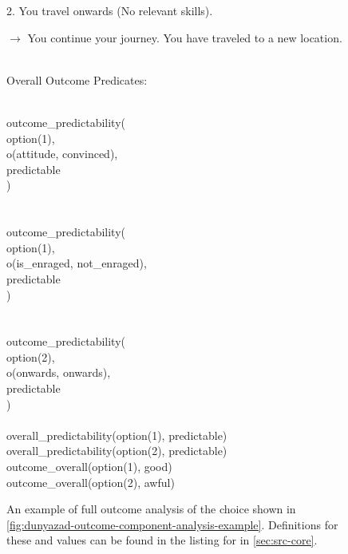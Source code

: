 \begin{enumerate}[leftmargin=1.4em]
\begin{figure}[!p]
{{{\begin{hangparas}{1.3em}{1}
2. You travel onwards (No relevant skills). \\
\ind \parbox{0.88\linewidth}{$\rightarrow$ You continue your journey. \newline You have traveled to a new location.}
\end{hangparas}
} \vind \\
Overall Outcome Predicates:\svind \\
\ind \parbox{0.85\textwidth}{ \tt \raggedright
{} \\
\ind outcome\_predictability( \\
\ind \ind option(1), \\
\ind \ind o(attitude, convinced), \\
\ind \ind predictable \\
\ind ) \\
 \\
 \\
\ind outcome\_predictability( \\
\ind \ind option(1), \\
\ind \ind o(is\_enraged, not\_enraged), \\
\ind \ind predictable \\
\ind ) \\
 \\
 \\
\ind outcome\_predictability( \\
\ind \ind option(2), \\
\ind \ind o(onwards, onwards), \\
\ind \ind predictable \\
\ind ) \\
 \\
 overall\_predictability(option(1), predictable) \\
 overall\_predictability(option(2), predictable) \\
 outcome\_overall(option(1), good) \\
 outcome\_overall(option(2), awful) \\
}
}
}
\caption[\dunyazad/ outcome component analysis example]{An example of full outcome analysis of the choice shown in \cref{fig:dunyazad-outcome-component-analysis-example}. Definitions for these   and  values can be found in the listing for  in \cref{sec:src-core}.}
\label{fig:dunyazad-full-outcome-analysis-example}
\end{figure}



\end{enumerate}
